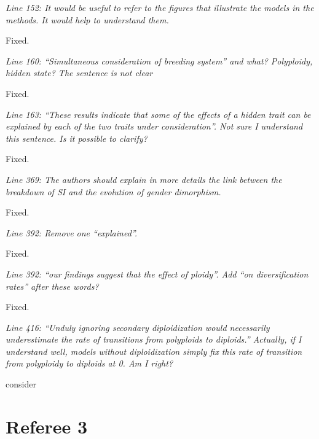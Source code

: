 \documentclass[11pt]{article}
\renewenvironment{quote}{\bigskip\noindent\itshape\ignorespaces}{\smallskip}
\begin{document}
\begin{quote}
Line 152: It would be useful to refer to the figures that illustrate the models in the methods.
It would help to understand them.
\end{quote}

Fixed. %

\begin{quote}
Line 160: ``Simultaneous consideration of breeding system'' and what?
Polyploidy, hidden state?
The sentence is not clear
\end{quote}

Fixed. %

\begin{quote}
Line 163: ``These results indicate that some of the effects of a hidden trait can be explained by each of the two traits under consideration''.
Not sure I understand this sentence. Is it possible to clarify?
\end{quote}

Fixed. %

\begin{quote}
Line 369: The authors should explain in more details the link between the breakdown of SI and the evolution of gender dimorphism.
\end{quote}

Fixed. %

\begin{quote}
Line 392: Remove one ``explained''.
\end{quote}

Fixed. %

\begin{quote}
Line 392: ``our findings suggest that the effect of ploidy''.
Add ``on diversification rates'' after these words?
\end{quote}

Fixed. %

\begin{quote}
Line 416: ``Unduly ignoring secondary diploidization would necessarily underestimate the rate of transitions from polyploids to diploids.''
Actually, if I understand well, models without diploidization simply fix this rate of transition from polyploidy to diploids at 0.
Am I right?
\end{quote}

consider %

\section{Referee 3}
\vspace{-11pt}
\end{document}

